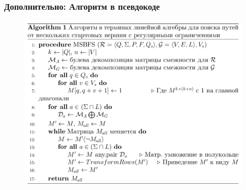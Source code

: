 \documentclass{beamer}
\begin{document}
\begin{frame}[fragile]
  \frametitle{Дополнительно: Алгоритм в псевдокоде}
  \begin{figure}
    \includegraphics[width=0.85\linewidth]{pictures/algo_pseudo.pdf}\\
  \end{figure}
\end{frame}
\end{document}
